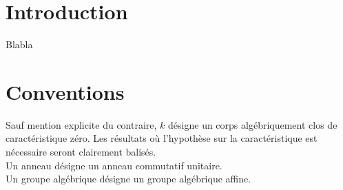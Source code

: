 
\chapter*{Introduction}

Blabla

\chapter*{Conventions}
\label{sec:conventions}

Sauf mention explicite du contraire, $k$ désigne un corps algébriquement clos de caractéristique zéro. Les résultats où l'hypothèse sur la caractéristique est nécessaire seront clairement balisés.\\
Un anneau désigne un anneau commutatif unitaire. \\
Un groupe algébrique désigne un groupe algébrique affine.


